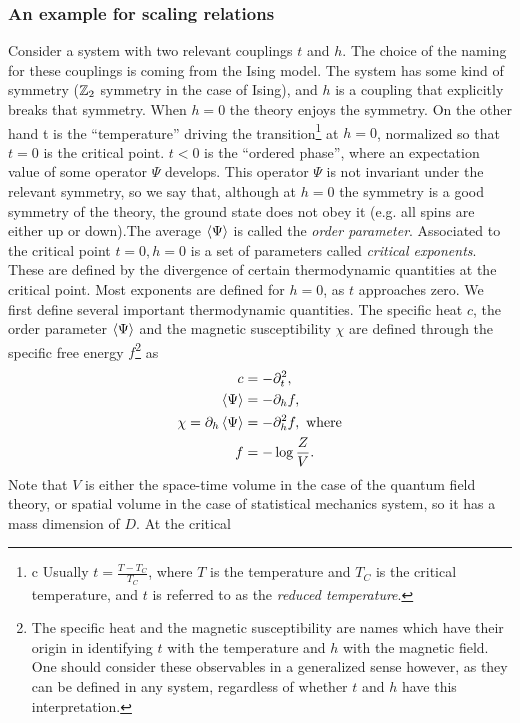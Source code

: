 \subsubsection{An example for scaling relations}
Consider a system with two relevant couplings $t$ and $h$. The choice of the naming for
these couplings is coming from the Ising model. The system has some kind of symmetry ($\mathbb{Z}_2$
symmetry in the case of Ising), and $h$ is a coupling that explicitly breaks that symmetry.
When $h = 0$ the theory enjoys the symmetry. On the other hand t is the “temperature”
driving the transition\footnote{c
	Usually $t=\frac{T-T_C}{T_C}$, where $T$ is the temperature and $T_C$ is the critical temperature, and $t$ is referred to
	as the \emph{reduced temperature}.} at $h = 0$, normalized so that $t = 0$ is the critical point. $t < 0$ is the
“ordered phase”, where an expectation value of some operator $\Psi$ develops. This operator
$\Psi$ is not invariant under the relevant symmetry, so we say that, although at $h = 0$ the
symmetry is a good symmetry of the theory, the ground state does not obey it (e.g. all
spins are either up or down).The average $\expval{\Psi}$ is called the \emph{order parameter}.
Associated to the critical point $t = 0, h = 0$ is a set of parameters called \emph{critical
exponents}. These are defined by the divergence of certain thermodynamic quantities at the
critical point. Most exponents are defined for $h = 0$, as $t$ approaches zero. We first define
several important thermodynamic quantities. The specific heat $c$, the order parameter $\expval{\Psi}$ and the magnetic susceptibility $\chi$ are defined through the specific free energy $f$\footnote{The specific heat and the magnetic susceptibility are names which have their origin in identifying $t$
	with the temperature and $h$ with the magnetic field. One should consider these observables in a generalized
	sense however, as they can be defined in any system, regardless of whether $t$ and $h$ have this interpretation.} as
\begin{align}
	c&= -\partial^2_t , \\
	\expval{\Psi} &= - \partial_h f, \\
	\chi = \partial_h \expval{\Psi} &= - \partial^2_h f, \text{ where} \\
	f &= - \log\frac{Z}{V} \nonumber.
\end{align}
Note that $V$ is
either the space-time volume in the case of the quantum field theory, or spatial volume in
the case of statistical mechanics system, so it has a mass dimension of $D$. At the critical
